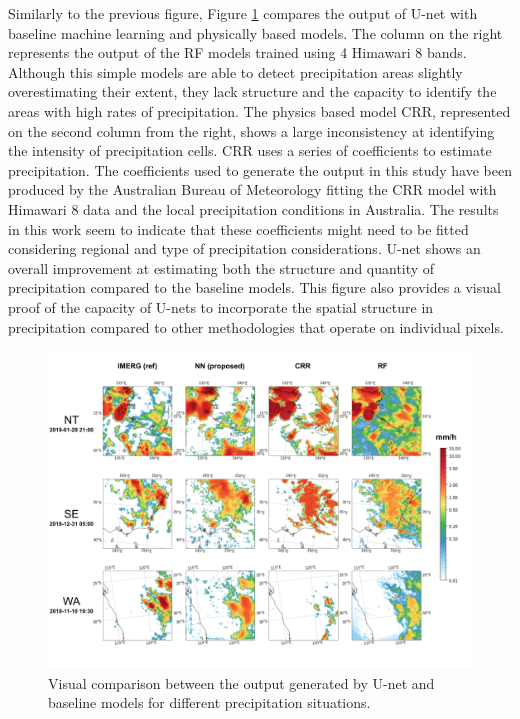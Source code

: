 \documentclass[3p,times]{elsarticle}
\begin{document}
Similarly to the previous figure, Figure \ref{baseline_cmp} compares the output of U-net with baseline machine learning and physically based models. The column on the right represents the output of the RF models trained using 4 Himawari 8 bands. Although this simple models are able to detect precipitation areas slightly overestimating their extent, they lack structure and the capacity to identify the areas with high rates of precipitation. The physics based model CRR, represented on the second column from the right, shows a large inconsistency at identifying the intensity of precipitation cells. CRR uses a series of coefficients to estimate precipitation. The coefficients used to generate the output in this study have been produced by the Australian Bureau of Meteorology fitting the CRR model with Himawari 8 data and the local precipitation conditions in Australia. The results in this work seem to indicate that these coefficients might need to be fitted considering regional and type of precipitation considerations. U-net shows an overall improvement at estimating both the structure and quantity of precipitation compared to the baseline models. This figure also provides a visual proof of the capacity of U-nets to incorporate the spatial structure in precipitation compared to other methodologies that operate on individual pixels.

\begin{figure}%
    \includegraphics[width=14cm]{baseline_cmp.png}
	\caption{Visual comparison between the output generated by U-net and baseline models for different precipitation situations.}%
    \label{baseline_cmp}%
\end{figure}
\end{document}
